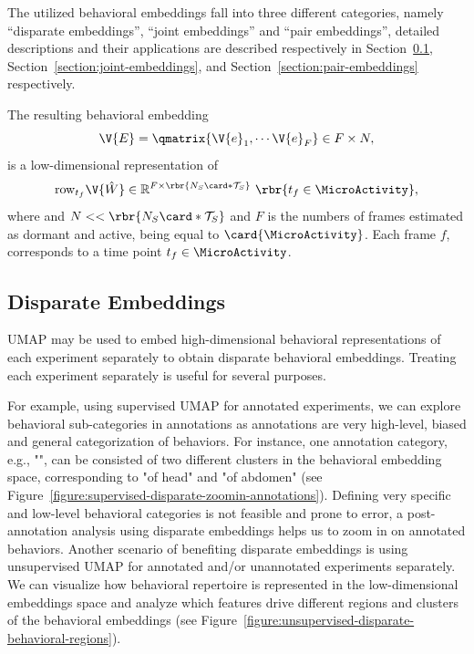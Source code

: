 The utilized behavioral embeddings fall into three different categories, namely ``disparate embeddings'', ``joint embeddings'' and ``pair embeddings'', detailed descriptions and their applications are described respectively in  Section~\ref{section:disparate-embeddings}, Section~\ref{section:joint-embeddings}, and  Section~\ref{section:pair-embeddings} respectively.

The resulting behavioral embedding
\begin{equation}
	\V{E}=\qmatrix{\V{e}_1, \cdots \V{e}_{F}} \in F \times N,
\end{equation}
is a low-dimensional representation of
\begin{equation}
	\mathrm{row}_{t_f} \V{\hat{W}} \in \mathbb{R}^{F \times \rbr{ N_S\card*{\mathcal{T}_S}}} \ \rbr{t_f \in \MicroActivity},
\end{equation}
where and $N << \rbr{ N_S\card*{\mathcal{T}_S}}$ and $F$ is the numbers of frames estimated as dormant and active, being equal to $\card{\MicroActivity}$.
Each frame $f$, corresponds to a time point $t_f\in \MicroActivity$.

\subsection{Disparate Embeddings}\label{section:disparate-embeddings}
UMAP may be used to embed high-dimensional behavioral representations of each experiment separately to obtain disparate behavioral embeddings. Treating each experiment separately is useful for several purposes.

For example, using supervised UMAP for annotated experiments, we can explore behavioral sub-categories in annotations as annotations are very high-level, biased and general categorization of behaviors. For instance, one annotation category, e.g., "\Grooming", can be consisted of two different clusters in the behavioral embedding space, corresponding to "\Grooming of head" and "\Grooming of abdomen" (see Figure~\ref{figure:supervised-disparate-zoomin-annotations}).
Defining very specific and low-level behavioral categories is not feasible and prone to error, a post-annotation analysis using disparate embeddings helps us to zoom in on annotated behaviors.
Another scenario of benefiting disparate embeddings is using unsupervised UMAP for annotated and/or unannotated experiments separately.
We can visualize how behavioral repertoire is represented in the low-dimensional embeddings space and analyze which features drive different regions and clusters of the behavioral embeddings (see Figure~\ref{figure:unsupervised-disparate-behavioral-regions}).

